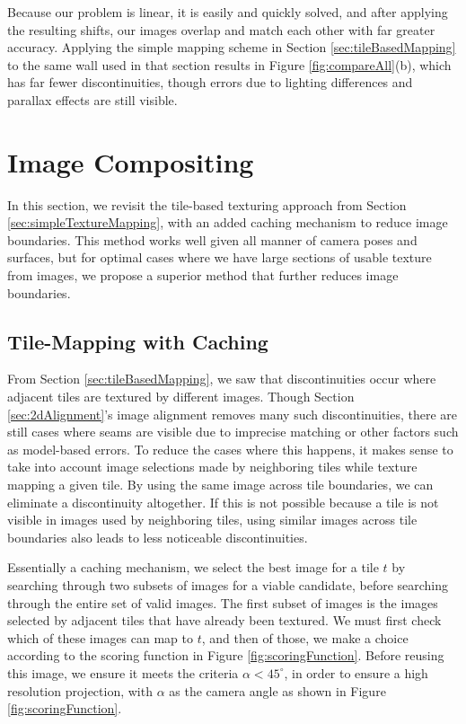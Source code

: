 \documentclass[]{spie}  %
\begin{document}
Because our problem is linear, it is easily and quickly solved, and
after applying the resulting shifts, our images overlap and match each
other with far greater accuracy. Applying the simple mapping scheme in
Section \ref{sec:tileBasedMapping} to the same wall used in that
section results in Figure \ref{fig:compareAll}(b), which has far fewer
discontinuities, though errors due to lighting differences and
parallax effects are still visible.

\section{Image Compositing}
\label{sec:imageCompositing}
In this section, we revisit the tile-based texturing approach from
Section \ref{sec:simpleTextureMapping}, with an added caching
mechanism to reduce image boundaries. This method works well given all
manner of camera poses and surfaces, but for optimal cases where we
have large sections of usable texture from images, we propose a
superior method that further reduces image boundaries.

\subsection{Tile-Mapping with Caching}
\label{sec:mappingWithCaching}
From Section \ref{sec:tileBasedMapping}, we saw that discontinuities
occur where adjacent tiles are textured by different images. Though
Section \ref{sec:2dAlignment}'s image alignment removes many such
discontinuities, there are still cases where seams are visible due to
imprecise matching or other factors such as model-based errors. To
reduce the cases where this happens, it makes sense to take into
account image selections made by neighboring tiles while texture
mapping a given tile. By using the same image across tile boundaries,
we can eliminate a discontinuity altogether. If this is not possible
because a tile is not visible in images used by neighboring tiles,
using similar images across tile boundaries also leads to less
noticeable discontinuities.

Essentially a caching mechanism, we select the best image for a tile
$t$ by searching through two subsets of images for a viable candidate,
before searching through the entire set of valid images. The first
subset of images is the images selected by adjacent tiles that have
already been textured. We must first check which of these images can
map to $t$, and then of those, we make a choice according to the
scoring function in Figure \ref{fig:scoringFunction}. Before reusing
this image, we ensure it meets the criteria $\alpha < 45^\circ$, in
order to ensure a high resolution projection, with $\alpha$ as the
camera angle as shown in Figure \ref{fig:scoringFunction}.
\end{document}
